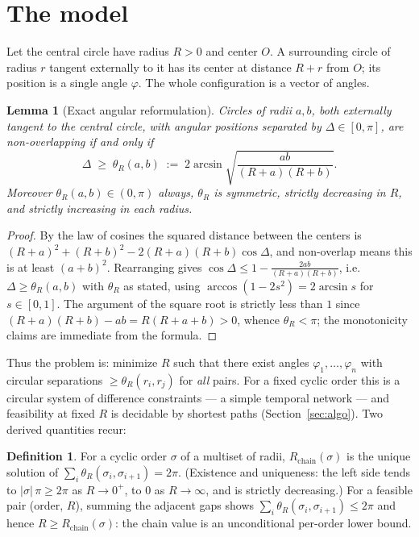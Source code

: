 \documentclass[11pt]{article}
\newtheorem{lemma}[theorem]{Lemma}
\theoremstyle{definition}
\newtheorem{definition}[theorem]{Definition}
\theoremstyle{remark}
\DeclareMathOperator{\asin}{arcsin}
\begin{document}
\section{The model}\label{sec:model}

Let the central circle have radius $R>0$ and center $O$. A surrounding circle of radius $r$ tangent externally to it has its center at distance $R+r$ from $O$; its position is a single angle $\varphi$. The whole configuration is a vector of angles.

\begin{lemma}[Exact angular reformulation]\label{lem:angular}
Circles of radii $a,b$, both externally tangent to the central circle, with angular positions separated by $\Delta\in[0,\pi]$, are non-overlapping if and only if
\[
\Delta \;\ge\; \theta_R(a,b)\;:=\;2\asin\sqrt{\frac{ab}{(R+a)(R+b)}}.
\]
Moreover $\theta_R(a,b)\in(0,\pi)$ always, $\theta_R$ is symmetric, strictly decreasing in $R$, and strictly increasing in each radius.
\end{lemma}

\begin{proof}
By the law of cosines the squared distance between the centers is $(R+a)^2+(R+b)^2-2(R+a)(R+b)\cos\Delta$, and non-overlap means this is at least $(a+b)^2$. Rearranging gives $\cos\Delta\le 1-\frac{2ab}{(R+a)(R+b)}$, i.e.\ $\Delta\ge\theta_R(a,b)$ with $\theta_R$ as stated, using $\arccos(1-2s^2)=2\asin s$ for $s\in[0,1]$. The argument of the square root is strictly less than $1$ since $(R+a)(R+b)-ab=R(R+a+b)>0$, whence $\theta_R<\pi$; the monotonicity claims are immediate from the formula.
\end{proof}

Thus the problem is: minimize $R$ such that there exist angles $\varphi_1,\dots,\varphi_n$ with circular separations $\ge\theta_R(r_i,r_j)$ for \emph{all} pairs. For a fixed cyclic order this is a circular system of difference constraints --- a simple temporal network --- and feasibility at fixed $R$ is decidable by shortest paths (Section~\ref{sec:algo}). Two derived quantities recur:

\begin{definition}
For a cyclic order $\sigma$ of a multiset of radii, $R_{\mathrm{chain}}(\sigma)$ is the unique solution of $\sum_i \theta_R(\sigma_i,\sigma_{i+1})=2\pi$. (Existence and uniqueness: the left side tends to $|\sigma|\,\pi\ge 2\pi$ as $R\to0^+$, to $0$ as $R\to\infty$, and is strictly decreasing.) For a feasible pair (order, $R$), summing the adjacent gaps shows $\sum_i\theta_R(\sigma_i,\sigma_{i+1})\le2\pi$ and hence $R\ge R_{\mathrm{chain}}(\sigma)$: the chain value is an unconditional per-order lower bound.
\end{definition}
\end{document}
